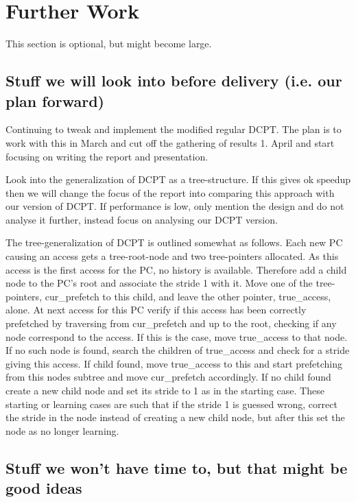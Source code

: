 \documentclass[12pt,journal,compsoc]{IEEEtran}
\begin{document}
\section{Further Work}
This section is optional, but might become large.

\subsection{Stuff we will look into before delivery (i.e. our plan forward)}
Continuing to tweak and implement the modified regular DCPT. The plan is
to work with this in March and cut off the gathering of results 1. April
and start focusing on writing the report and presentation.

Look into the generalization of DCPT as a tree-structure. If this gives
ok speedup then we will change the focus of the report into comparing this
approach with our version of DCPT. If performance is low, only mention the
design and do not analyse it further, instead focus on analysing our
DCPT version.

The tree-generalization of DCPT is outlined somewhat as follows. Each new PC
causing an access gets a tree-root-node and two tree-pointers allocated.
As this access is the first access for the PC, no history is available.
Therefore add a child node to the PC's root and associate the stride 1 with it.
Move one of the tree-pointers, cur\_prefetch to this child, and leave the other
pointer, true\_access, alone. At next access for this PC verify if this access
has been correctly prefetched by traversing from cur\_prefetch and up to the
root, checking if any node correspond to the access. If this is the case,
move true\_access to that node. If no such node is found, search the children
of true\_access and check for a stride giving this access. If child found, move
true\_access to this and start prefetching from this nodes subtree and move
cur\_prefetch accordingly. If no child found create a new child node and set
its stride to 1 as in the starting case. These starting or learning cases
are such that if the stride 1 is guessed wrong, correct the stride in the node
instead of creating a new child node, but after this set the node as no longer
learning.

\subsection{Stuff we won't have time to, but that might be good ideas}

\end{document}
